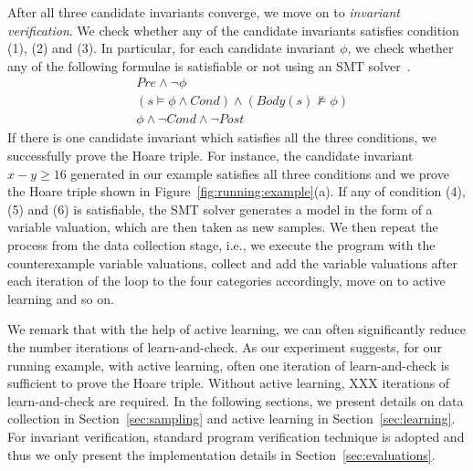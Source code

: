 After all three candidate invariants converge, we move on to \emph{invariant verification}. We check whether any of the candidate invariants satisfies condition (1), (2) and (3). In particular, for each candidate invariant $\phi$, we check whether any of the following formulae is satisfiable or not using an SMT solver~\cite{z3}.
\begin{align}
    & Pre \land \neg \phi \label{inv:pre} \\
    & (s \models \phi \land Cond) \land (Body(s) \not \models \phi) \label{inv:loop} \\
    & \phi \land \neg Cond \land \neg Post \label{inv:post}
\end{align}
If there is one candidate invariant which satisfies all the three conditions, we successfully prove the Hoare triple. For instance, the candidate invariant $x - y \geq 16$ generated in our example satisfies all three conditions and we prove the Hoare triple shown in Figure~\ref{fig:running:example}(a). If any of condition (4), (5) and (6) is satisfiable, the SMT solver generates a model in the form of a variable valuation, which are then taken as new samples. We then repeat the process from the data collection stage, i.e., we execute the program with the counterexample variable valuations, collect and add the variable valuations after each iteration of the loop to the four categories accordingly, move on to active learning and so on. 

We remark that with the help of active learning, we can often significantly reduce the number iterations of learn-and-check. As our experiment suggests, for our running example, with active learning, often one iteration of learn-and-check is sufficient to prove the Hoare triple. Without active learning, XXX iterations of learn-and-check are required. In the following sections, we present details on data collection in Section~\ref{sec:sampling} and active learning in Section~\ref{sec:learning}. For invariant verification, standard program verification technique is adopted and thus we only present the implementation details in Section~\ref{sec:evaluations}.





